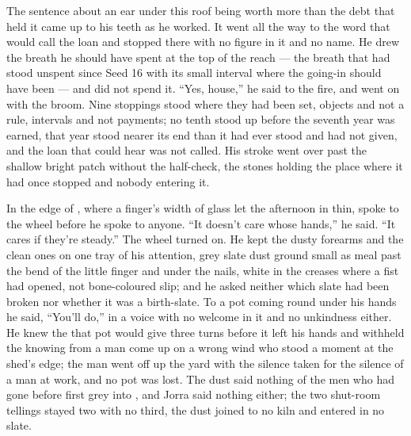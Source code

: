The sentence about an ear under this roof being worth more than the debt that held it came up to his teeth as he worked. It went all the way to the word that would call the loan and stopped there with no figure in it and no name. He drew the breath he should have spent at the top of the reach --- the breath that had stood unspent since Seed 16 with its small interval where the going-in should have been --- and did not spend it. “Yes, house,” he said to the fire, and went on with the broom. Nine stoppings stood where they had been set, objects and not a rule, intervals and not payments; no tenth stood up before the seventh year was earned, that year stood nearer its end than it had ever stood and had not given, and the loan that could hear was not called. His stroke went over  past the shallow bright patch without the half-check, the stones holding the place where it had once stopped and nobody entering it.

\scenebreak

In the edge of , where a finger's width of glass let the afternoon in thin,  spoke to the wheel before he spoke to anyone. “It doesn't care whose hands,” he said. “It cares if they're steady.” The wheel turned on. He kept the dusty forearms and the clean ones on one tray of his attention, grey slate dust ground small as meal past the bend of the little finger and under the nails, white in the creases where a fist had opened, not bone-coloured slip; and he asked neither which slate had been broken nor whether it was a birth-slate. To a pot coming round under his hands he said, “You'll do,” in a voice with no welcome in it and no unkindness either. He knew the  that pot would give three turns before it left his hands and withheld the knowing from a man come up on a wrong wind who stood a moment at the shed's edge; the man went off up the yard with the silence taken for the silence of a man at work, and no pot was lost. The dust said nothing of the men who had gone before first grey into , and Jorra said nothing either; the two shut-room tellings stayed two with no third, the dust joined to no kiln and entered in no slate.

